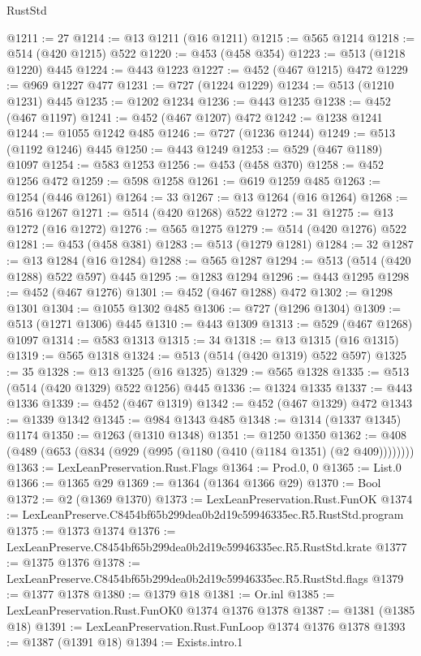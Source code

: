 \begin{lexlean}{RustStd}
\begin{coremodule}
@1211 := 27
@1214 := @13 @1211 (@16 @1211)
@1215 := @565 @1214
@1218 := @514 (@420 @1215) @522
@1220 := @453 (@458 @354)
@1223 := @513 (@1218 @1220) @445
@1224 := @443 @1223
@1227 := @452 (@467 @1215) @472
@1229 := @969 @1227 @477
@1231 := @727 (@1224 @1229)
@1234 := @513 (@1210 @1231) @445
@1235 := @1202 @1234
@1236 := @443 @1235
@1238 := @452 (@467 @1197)
@1241 := @452 (@467 @1207) @472
@1242 := @1238 @1241
@1244 := @1055 @1242 @485
@1246 := @727 (@1236 @1244)
@1249 := @513 (@1192 @1246) @445
@1250 := @443 @1249
@1253 := @529 (@467 @1189) @1097
@1254 := @583 @1253
@1256 := @453 (@458 @370)
@1258 := @452 @1256 @472
@1259 := @598 @1258
@1261 := @619 @1259 @485
@1263 := @1254 (@446 @1261)
@1264 := 33
@1267 := @13 @1264 (@16 @1264)
@1268 := @516 @1267
@1271 := @514 (@420 @1268) @522
@1272 := 31
@1275 := @13 @1272 (@16 @1272)
@1276 := @565 @1275
@1279 := @514 (@420 @1276) @522
@1281 := @453 (@458 @381)
@1283 := @513 (@1279 @1281)
@1284 := 32
@1287 := @13 @1284 (@16 @1284)
@1288 := @565 @1287
@1294 := @513 (@514 (@420 @1288) @522 @597) @445
@1295 := @1283 @1294
@1296 := @443 @1295
@1298 := @452 (@467 @1276)
@1301 := @452 (@467 @1288) @472
@1302 := @1298 @1301
@1304 := @1055 @1302 @485
@1306 := @727 (@1296 @1304)
@1309 := @513 (@1271 @1306) @445
@1310 := @443 @1309
@1313 := @529 (@467 @1268) @1097
@1314 := @583 @1313
@1315 := 34
@1318 := @13 @1315 (@16 @1315)
@1319 := @565 @1318
@1324 := @513 (@514 (@420 @1319) @522 @597)
@1325 := 35
@1328 := @13 @1325 (@16 @1325)
@1329 := @565 @1328
@1335 := @513 (@514 (@420 @1329) @522 @1256) @445
@1336 := @1324 @1335
@1337 := @443 @1336
@1339 := @452 (@467 @1319)
@1342 := @452 (@467 @1329) @472
@1343 := @1339 @1342
@1345 := @984 @1343 @485
@1348 := @1314 (@1337 @1345) @1174
@1350 := @1263 (@1310 @1348)
@1351 := @1250 @1350
@1362 := @408 (@489 (@653 (@834 (@929 (@995 (@1180 (@410 (@1184 @1351) (@2 @409))))))))
@1363 := LexLeanPreservation.Rust.Flags
@1364 := Prod.{0, 0}
@1365 := List.{0}
@1366 := @1365 @29
@1369 := @1364 (@1364 @1366 @29)
@1370 := Bool
@1372 := @2 (@1369 @1370)
@1373 := LexLeanPreservation.Rust.FunOK
@1374 := LexLeanPreserve.C8454bf65b299dea0b2d19c59946335ec.R5.RustStd.program
@1375 := @1373 @1374
@1376 := LexLeanPreserve.C8454bf65b299dea0b2d19c59946335ec.R5.RustStd.krate
@1377 := @1375 @1376
@1378 := LexLeanPreserve.C8454bf65b299dea0b2d19c59946335ec.R5.RustStd.flags
@1379 := @1377 @1378
@1380 := @1379 @18
@1381 := Or.inl
@1385 := LexLeanPreservation.Rust.FunOK0 @1374 @1376 @1378
@1387 := @1381 (@1385 @18)
@1391 := LexLeanPreservation.Rust.FunLoop @1374 @1376 @1378
@1393 := @1387 (@1391 @18)
@1394 := Exists.intro.{1}

\end{coremodule}
\end{lexlean}
